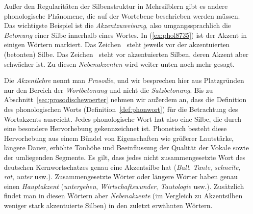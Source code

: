 
Außer den Regularitäten der Silbenstruktur in Mehrsilblern gibt es andere phonologische Phänomene, die auf der Wortebene beschrieben werden müssen.
Das wichtigste Beispiel ist die \textit{Akzentzuweisung}, also umgangssprachlich die \textit{Betonung} einer Silbe innerhalb eines Wortes.
In (\ref{ex:phol8735}) ist der Akzent in einigen Wörtern markiert.
Das Zeichen \Akz\ steht jeweils vor der akzentuierten (betonten) Silbe.
Das Zeichen \Nakz\ steht vor akzentuierten Silben, deren Akzent aber schwächer ist.
Zu diesen \textit{Nebenakzenten} wird weiter unten noch mehr gesagt.

\begin{exe}
  \ex\label{ex:phol8735}
  \begin{xlist}
  \end{xlist}
\end{exe}

Die \textit{Akzentlehre} nennt man \textit{Prosodie}, und wir besprechen hier aus Platzgründen nur den Bereich der \textit{Wortbetonung} und \zB nicht die \textit{Satzbetonung}.
Bis zu Abschnitt~\ref{sec:prosodischewoerter} nehmen wir außerdem an, dass die Definition des phonologischen Worts (Definition~\ref{def:phonwort}) für die Betrachtung des Wortakzents ausreicht.
Jedes phonologische Wort hat also eine Silbe, die durch eine besondere Hervorhebung gekennzeichnet ist.
Phonetisch besteht diese Hervorhebung aus einem Bündel von Eigenschaften wie größerer Lautstärke, längere Dauer, erhöhte Tonhöhe und Beeinflussung der Qualität der Vokale sowie der umliegenden Segmente.
Es gilt, dass jedes nicht zusammengesetzte Wort des deutschen Kernwortschatzes genau eine Akzentsilbe hat (\textit{\Akz Ball}, \textit{\Akz Tante}, \textit{\Akz schneite}, \textit{\Akz rot}, \textit{\Akz unter} usw.).
Zusammengesetzte Wörter oder längere Wörter haben genau einen \textit{Hauptakzent} (\textit{\Akz untergehen}, \textit{\Akz Wirtschaftswunder}, \textit{Tautolo\Akz gie} usw.).
Zusätzlich findet man in diesen Wörtern aber \textit{Nebenakzente} (im Vergleich zu Akzentsilben weniger stark akzentuierte Silben) in den zuletzt erwähnten Wörtern.

